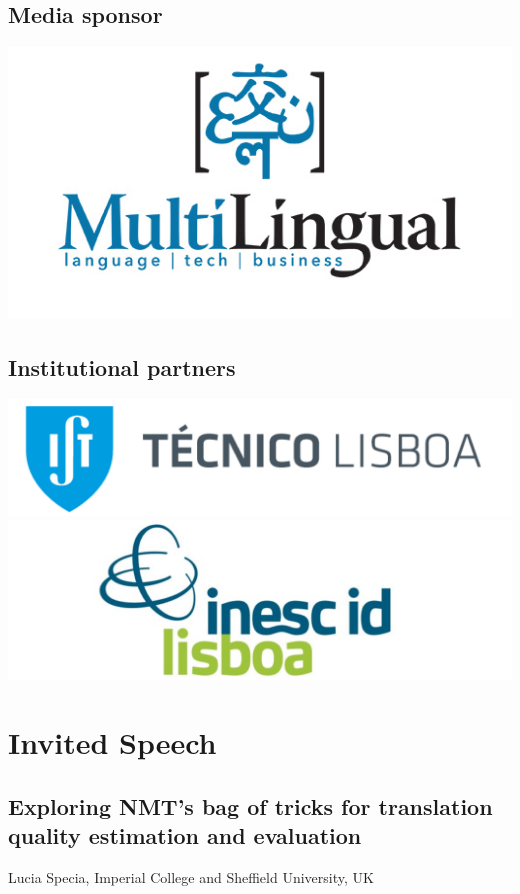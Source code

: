 \documentclass[a4paper,11pt,twoside]{book}
\newcommand{\newoddpage} {\clearpage
  \ifthenelse{\isodd{\value{page}}}{}
  {\thispagestyle{empty}\quad\newpage}}
\begin{document}
\vfill

\section*{Media sponsor}

\begin{center}
\includegraphics[width=0.55\columnwidth]{logos/multilingual-logo.jpg}
\end{center}

\vfill

\section*{Institutional partners}

\begin{center}
\includegraphics[width=0.6\columnwidth]{logos/ist-logo.png}\\

\includegraphics[width=0.6\columnwidth]{logos/inescid-logo.png}
\end{center}

\newoddpage
\mainmatter

\chapter*{Invited Speech}

\section*{Exploring NMT's bag of tricks for translation quality estimation and evaluation}\label{invited}
Lucia Specia, Imperial College and Sheffield University, UK
\vspace{0.5cm}
\end{document}
